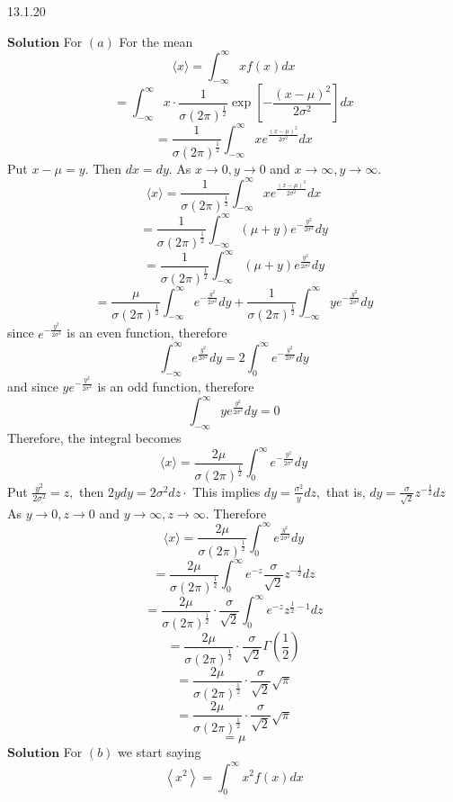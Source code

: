 \documentclass{article}
\begin{document}
\begin{flushleft}
\begin{mybox}{13.1.20}
\end{mybox}

$\boxed{\textbf{Solution}}$ For $(a)$ For the mean
$$
\langle x\rangle=\int_{-\infty}^{\infty} x f(x) d x
$$
$$
=\int_{-\infty}^{\infty} x \cdot \frac{1}{\sigma(2 \pi)^{\frac{1}{2}}} \exp \left[-\frac{(x-\mu)^{2}}{2 \sigma^{2}}\right] d x
$$
$$
=\frac{1}{\sigma(2 \pi)^{\frac{1}{2}}} \int_{-\infty}^{\infty} x e^{\frac{(x-\mu)^{2}}{2 \sigma^{2}}} d x
$$
Put $x-\mu=y .$ Then $d x=d y .$ As $x \rightarrow 0, y \rightarrow 0$ and $x \rightarrow \infty, y \rightarrow \infty$.
$$
\langle x\rangle=\frac{1}{\sigma(2 \pi)^{\frac{1}{2}}} \int_{-\infty}^{\infty} x e^{\frac{(x-\mu)^{2}}{2 \sigma^{2}}} d x
$$
$$
=\frac{1}{\sigma(2 \pi)^{\frac{1}{2}}} \int_{-\infty}^{\infty}(\mu+y) e^{-\frac{y^{2}}{2 \sigma^{2}}} d y
$$
$$
=\frac{1}{\sigma(2 \pi)^{\frac{1}{2}}} \int_{-\infty}^{\infty}(\mu+y) e^{\frac{y^{2}}{2 \sigma^{2}}} d y
$$
$$
=\frac{\mu}{\sigma(2 \pi)^{\frac{1}{2}}} \int_{-\infty}^{\infty} e^{-\frac{y^{2}}{2 \sigma^{2}}} d y+\frac{1}{\sigma(2 \pi)^{\frac{1}{2}}} \int_{-\infty}^{\infty} y e^{-\frac{y^{2}}{2 \sigma^{2}}} d y
$$
since $e^{-\frac{y^{2}}{2 \sigma^{2}}}$ is an even function, therefore 
$$\int_{-\infty}^{\infty} e^{\frac{y^{2}}{2 \sigma^{2}}} d y=2 \int_{0}^{\infty} e^{-\frac{y^{2}}{2 \sigma^{2}}} d y$$
and since $y e^{-\frac{y^{2}}{2 \sigma^{2}}}$ is an odd
function, therefore 
$$\int_{-\infty}^{\infty} y e^{\frac{y^{2}}{2 \sigma^{2}}} d y=0$$
Therefore, the integral becomes
$$
\langle x\rangle=\frac{2 \mu}{\sigma(2 \pi)^{\frac{1}{2}}} \int_{0}^{\infty} e^{-\frac{y^{2}}{2 \sigma^{2}}} d y
$$
Put $\frac{y^{2}}{2 \sigma^{2}}=z,$ then $2 y d y=2 \sigma^{2} d z \cdot$ This implies $d y=\frac{\sigma^{2}}{y} d z,$ that is, $d y=\frac{\sigma}{\sqrt{2}} z^{-\frac{1}{2}} d z$
As $y \rightarrow 0, z \rightarrow 0$ and $y \rightarrow \infty, z \rightarrow \infty$. Therefore
$$\langle x\rangle=\frac{2 \mu}{\sigma(2 \pi)^{\frac{1}{2}}} \int_{0}^{\infty} e^{\frac{y^{2}}{2 \sigma^{2}}} d y$$
$$=\frac{2 \mu}{\sigma(2 \pi)^{\frac{1}{2}}} \int_{0}^{\infty} e^{-z} \frac{\sigma}{\sqrt{2}} z^{-\frac{1}{2}} d z$$
$$=\frac{2 \mu}{\sigma(2 \pi)^{\frac{1}{2}}} \cdot \frac{\sigma}{\sqrt{2}} \int_{0}^{\infty} e^{-z} z^{\frac{1}{2}-1} d z$$
$$=\frac{2 \mu}{\sigma(2 \pi)^{\frac{1}{2}}} \cdot \frac{\sigma}{\sqrt{2}} \Gamma\left(\frac{1}{2}\right)$$
$$=\frac{2 \mu}{\sigma(2 \pi)^{\frac{1}{2}}} \cdot \frac{\sigma}{\sqrt{2}} \sqrt{\pi}$$
$$=\frac{2 \mu}{\sigma(2 \pi)^{\frac{1}{2}}} \cdot \frac{\sigma}{\sqrt{2}} \sqrt{\pi}$$
$$=\mu$$
$\boxed{\textbf{Solution}}$ For $(b)$ we start saying
$$
\left\langle x^{2}\right\rangle=\int_{0}^{\infty} x^{2} f(x) d x
$$
\end{flushleft}
\end{document}

